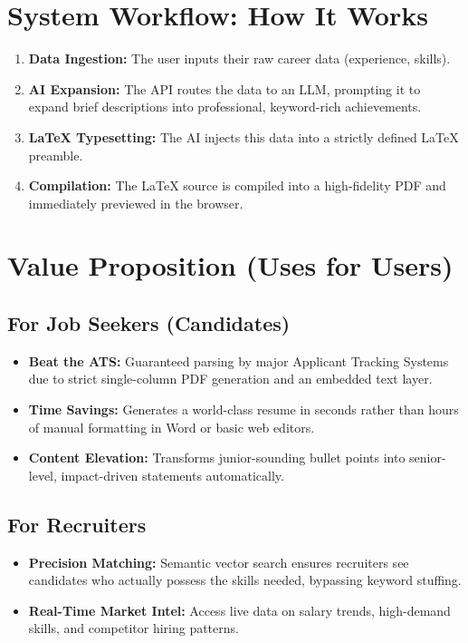 \documentclass[12pt, a4paper]{article}
\begin{document}
\section{System Workflow: How It Works}
\begin{enumerate}
    \item \textbf{Data Ingestion:} The user inputs their raw career data (experience, skills). 
    \item \textbf{AI Expansion:} The API routes the data to an LLM, prompting it to expand brief descriptions into professional, keyword-rich achievements.
    \item \textbf{LaTeX Typesetting:} The AI injects this data into a strictly defined LaTeX preamble. 
    \item \textbf{Compilation:} The LaTeX source is compiled into a high-fidelity PDF and immediately previewed in the browser.
\end{enumerate}

\section{Value Proposition (Uses for Users)}

\subsection{For Job Seekers (Candidates)}
\begin{itemize}
    \item \textbf{Beat the ATS:} Guaranteed parsing by major Applicant Tracking Systems due to strict single-column PDF generation and an embedded text layer.
    \item \textbf{Time Savings:} Generates a world-class resume in seconds rather than hours of manual formatting in Word or basic web editors.
    \item \textbf{Content Elevation:} Transforms junior-sounding bullet points into senior-level, impact-driven statements automatically.
\end{itemize}

\subsection{For Recruiters}
\begin{itemize}
    \item \textbf{Precision Matching:} Semantic vector search ensures recruiters see candidates who actually possess the skills needed, bypassing keyword stuffing.
    \item \textbf{Real-Time Market Intel:} Access live data on salary trends, high-demand skills, and competitor hiring patterns.
\end{itemize}
\end{document}
